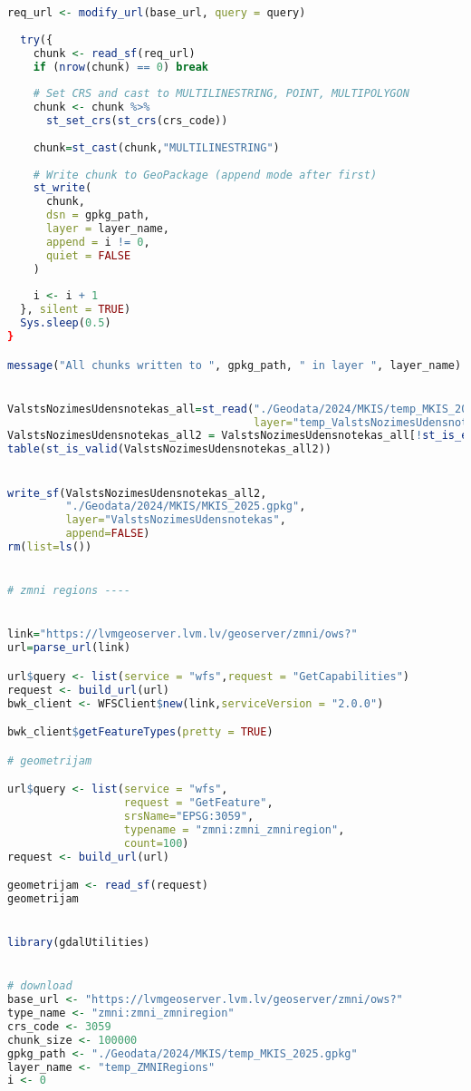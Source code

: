 \documentclass[
]{book}
\begin{document}
\begin{lstlisting}[language=R]
  req_url <- modify_url(base_url, query = query)
  
  try({
    chunk <- read_sf(req_url)
    if (nrow(chunk) == 0) break
    
    # Set CRS and cast to MULTILINESTRING, POINT, MULTIPOLYGON
    chunk <- chunk %>%
      st_set_crs(st_crs(crs_code))
    
    chunk=st_cast(chunk,"MULTILINESTRING")
    
    # Write chunk to GeoPackage (append mode after first)
    st_write(
      chunk, 
      dsn = gpkg_path,
      layer = layer_name,
      append = i != 0,
      quiet = FALSE
    )
    
    i <- i + 1
  }, silent = TRUE)
  Sys.sleep(0.5)
}

message("All chunks written to ", gpkg_path, " in layer ", layer_name)


ValstsNozimesUdensnotekas_all=st_read("./Geodata/2024/MKIS/temp_MKIS_2025.gpkg",
                                      layer="temp_ValstsNozimesUdensnotekas")
ValstsNozimesUdensnotekas_all2 = ValstsNozimesUdensnotekas_all[!st_is_empty(ValstsNozimesUdensnotekas_all),,drop=FALSE] # 0
table(st_is_valid(ValstsNozimesUdensnotekas_all2))


write_sf(ValstsNozimesUdensnotekas_all2,
         "./Geodata/2024/MKIS/MKIS_2025.gpkg",
         layer="ValstsNozimesUdensnotekas",
         append=FALSE)
rm(list=ls())


# zmni regions ----


link="https://lvmgeoserver.lvm.lv/geoserver/zmni/ows?"
url=parse_url(link)

url$query <- list(service = "wfs",request = "GetCapabilities")
request <- build_url(url)
bwk_client <- WFSClient$new(link,serviceVersion = "2.0.0")

bwk_client$getFeatureTypes(pretty = TRUE)

# geometrijam

url$query <- list(service = "wfs",
                  request = "GetFeature",
                  srsName="EPSG:3059",
                  typename = "zmni:zmni_zmniregion",
                  count=100)
request <- build_url(url)

geometrijam <- read_sf(request)
geometrijam


library(gdalUtilities)


# download
base_url <- "https://lvmgeoserver.lvm.lv/geoserver/zmni/ows?"
type_name <- "zmni:zmni_zmniregion"
crs_code <- 3059
chunk_size <- 100000
gpkg_path <- "./Geodata/2024/MKIS/temp_MKIS_2025.gpkg"
layer_name <- "temp_ZMNIRegions"
i <- 0


\end{lstlisting}
\end{document}
